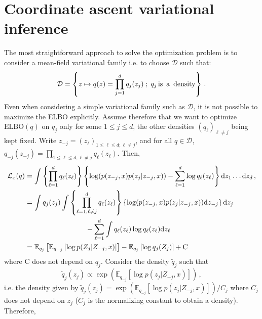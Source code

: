 \documentclass[english,graybox,envcountchap,envcountsame,sectrefs,shortlabels]{svmono}
\theoremstyle{style}
\begin{document}
\section{Coordinate ascent variational inference}
The most straightforward approach to solve the optimization problem is to consider a mean-field variational family  i.e. to choose $\mathcal{D}$ such that: 
$$
\mathcal{D} = \left\{z\mapsto q(z) = \prod_{j=1}^dq_j(z_j)\;;\; q_j \,\mbox{is\, a\, density} \right\}\,.
$$
Even when considering a simple variational family such as $\mathcal{D}$, it is not possible to maximize the ELBO explicitly. Assume therefore that we want to optimize $\mathrm{ELBO}(q) $ on $q_j$ only for some $1\leq j \leq d$, the other densities $(q_\ell)_{\ell\neq j}$ being kept fixed.
Write $z_{-j} = (z_\ell)_{1\leq \ell \leq d; \ell \neq j}$, and for all $q\in \mathcal{D}$,  $q_{-j}(z_{-j}) = \prod_{1\leq \ell \leq d; \ell \neq j}q_{\ell}(z_{\ell})$. Then,
\begin{align*}
\mathcal{L}_x(q) &= \int \left\{\prod_{\ell=1}^dq_\ell(z_\ell)\right\} \left\{\log (p(z_{-j},x)p(z_j|z_{-j},x)) - \sum_{\ell=1}^d\log q_\ell(z_\ell)\right\}\rmd z_1\ldots \rmd z_d\,,\\
&= \int q_j(z_j)\int \left\{\prod_{\ell=1, \ell\neq j}^dq_\ell(z_\ell)\right\} \left\{\log (p(z_{-j},x)p(z_j|z_{-j},x))\rmd z_{-j}\right\}\rmd z_j \\
&\hspace{3cm}- \sum_{\ell=1}^d\int q_\ell(z_\ell)\log q_\ell(z_\ell)\rmd z_\ell  \,\\
&= \mathbb{E}_{q_j}\left[\mathbb{E}_{q_{-j}}\left[\log p(Z_j | Z_{-j},x)\right]\right] - \mathbb{E}_{q_j}\left[\log q_j(Z_j)\right]  + \mathrm{C}
\end{align*}
where $\mathrm{C}$ does not depend on $q_j$. %
Consider the density $\tilde q_j$ such that
$$
\tilde q_j(z_j) \propto \exp\left(\mathbb{E}_{q_{-j}}\left[\log p(z_j | Z_{-j},x)\right]\right)\,,
$$
i.e. the density given by $\tilde q_j(z_j)= \exp(\mathbb{E}_{q_{-j}}[\log p(z_j | Z_{-j},x)])/C_j$ where $C_j$ does not depend on $z_j$ ($C_j$ is the normalizing constant to obtain a density). Therefore,
\end{document}
